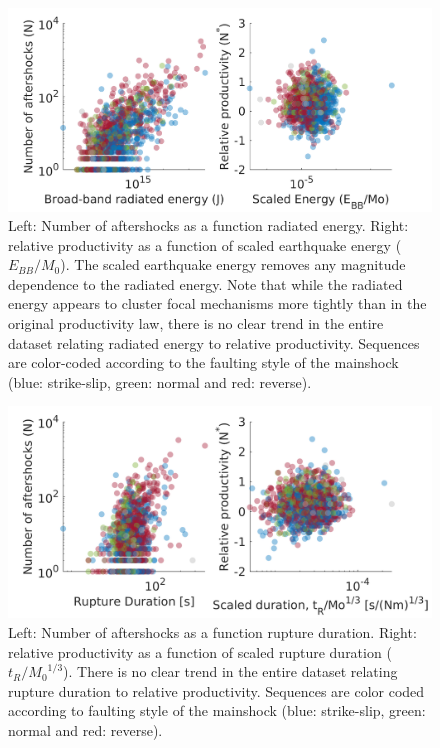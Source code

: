 \documentclass[12pt, notitlepage]{report}
\begin{document}
\begin{figure}[!ht]
    \centering
    \includegraphics{figures/prod_vs_energy.png}
    \caption{Left: Number of aftershocks as a function radiated energy. Right: relative productivity as a function of scaled earthquake energy ($E_{BB}/M_0$). The scaled earthquake energy removes any magnitude dependence to the radiated energy. Note that while the radiated energy appears to cluster focal mechanisms more tightly than in the original productivity law, there is no clear trend in the entire dataset relating radiated energy to relative productivity. Sequences are color-coded according to the faulting style of the mainshock (blue: strike-slip, green: normal and red: reverse).}
    \label{fig:Energy}
\end{figure}

\begin{figure}
    \centering
    \includegraphics{figures/prod_vs_dur.png}
    \caption{Left: Number of aftershocks as a function rupture duration. Right: relative productivity as a function of scaled rupture duration ($t_R/{M_0}^{1/3}$). There is no clear trend in the entire dataset relating rupture duration to relative productivity. Sequences are color coded according to faulting style of the mainshock (blue: strike-slip, green: normal and red: reverse).}
    \label{fig:prod_vs_dur}
\end{figure}
\end{document}
